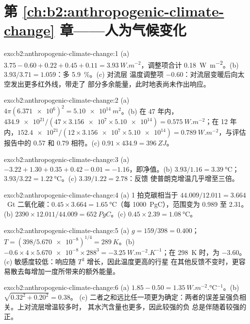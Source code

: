 \section*{第 \ref{ch:b2:anthropogenic-climate-change} 章——人为气候变化}

\begin{solution}{exo:b2:anthropogenic-climate-change:1}
(a) $3.75 - 0.60 + 0.22 + 0.45 + 0.11 = \qty{3.93}{W.m^{-2}}$，调整项合计
\qty{0.18}{W.m^{-2}}。(b) $3.93/3.71 = 1.059$：多 \qty{5.9}{\percent}。(c) 对流层
温度调整项 $-0.60$：对流层变暖后向太空发出更多红外线，带走了
部分多余能量，此时地表尚未作出响应。
\end{solution}

\begin{solution}{exo:b2:anthropogenic-climate-change:2}
(a) $4\pi(\num{6.371e6})^2 = \qty{5.10e14}{m^2}$。(b) 在 47 年内，$\num{434.9e21}/(47 \times
\num{3.156e7} \times \num{5.10e14}) = \qty{0.575}{W.m^{-2}}$；在 12 年内，$\num{152.4e21}/(12
\times \num{3.156e7} \times \num{5.10e14}) = \qty{0.789}{W.m^{-2}}$，与评估报告中的
0.57 和 0.79 相符。(c) $0.91 \times 434.9 = \qty{396}{ZJ}$。
\end{solution}

\begin{solution}{exo:b2:anthropogenic-climate-change:3}
(a) $-3.22 + 1.30 + 0.35 + 0.42 - 0.01 = \num{-1.16}$，即净值。(b) $3.93/1.16 =
\qty{3.39}{\celsius}$；$3.93/3.22 = \qty{1.22}{\celsius}$。(c) $3.39/1.22 = 2.78$：反馈
使普朗克增温几乎增至三倍。
\end{solution}

\begin{solution}{exo:b2:anthropogenic-climate-change:4}
(a) 1 拍克碳相当于 $44.009/12.011 = 3.664$~Gt 二氧化碳：$0.45 \times 3.664 =
\qty{1.65}{\celsius}$（每 \qty{1000}{PgC}），范围变为 0.989 至 2.31。(b) $2390 \times
12.011/44.009 = \qty{652}{PgC}$。(c) $0.45 \times 2.39 = \qty{1.08}{\celsius}$。
\end{solution}

\begin{solution}{exo:b2:anthropogenic-climate-change:5}
(a) $g = 159/398 = 0.400$；$T = (398/\num{5.670e-8})^{1/4} = \qty{289}{K}$。(b) $-0.6 \times 4
\times \num{5.670e-8} \times 288^3 = \qty{-3.25}{W.m^{-2}.K^{-1}}$；在 \qty{298}{K} 时，为 $-3.60$。
(c) 敏感度较低：响应随 $T^3$ 增长，因此温度更高的行星
在其他反馈不变时，更容易散去每增加一度所带来的额外能量。
\end{solution}

\begin{solution}{exo:b2:anthropogenic-climate-change:6}
(a) $1.85 - 0.50 = \qty{1.35}{W.m^{-2}.\celsius^{-1}}$。(b) $\sqrt{0.32^2 + 0.20^2} = 0.38$。
(c) 二者之和远比任一项更为确定：两者的误差呈强负相关。上对流层增温较多时，
其水汽含量也更多，因此较强的负
总是伴随着较强的正。
\end{solution}


